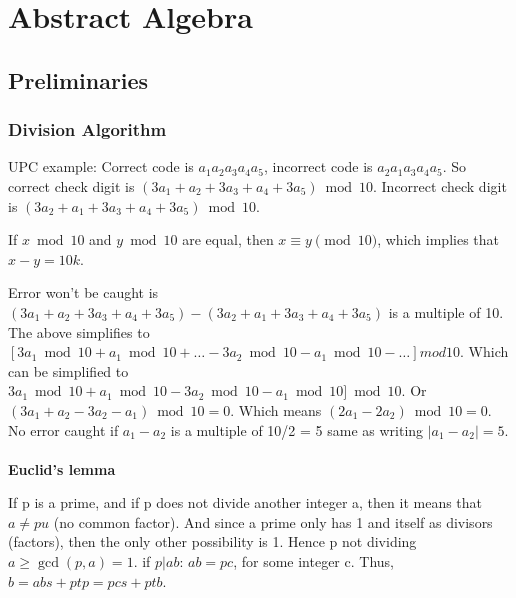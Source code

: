 \section{Abstract Algebra}

\subsection{Preliminaries}

\subsubsection{Division Algorithm}

UPC example:
Correct code is $a_1 a_2 a_3 a_4 a_5$, incorrect code is $a_2 a_1 a_3 a_4 a_5$.
So correct check digit is $(3a_1 + a_2 + 3a_3 + a_4 + 3a_5) \bmod 10$. 
Incorrect check digit is $(3a_2 + a_1 + 3a_3 + a_4 + 3a_5) \bmod 10$. 

If $x \bmod 10$ and $y \bmod 10$ are equal, then $x \equiv y \pmod 10$, which implies that $x - y = 10k$.

Error won’t be caught is $(3a_1 + a_2 + 3a_3 + a_4 + 3a_5) - (3a_2 + a_1 + 3a_3 + a_4 + 3a_5)$ is a multiple of 10. 
The above simplifies to $[3a_1 \bmod 10 + a_1 \bmod 10 + \dots - 3a_2 \bmod 10 - a_1 \bmod 10 - \dots] mod 10$.
Which can be simplified to $3a_1 \bmod 10 + a_1 \bmod 10 - 3a_2 \bmod 10 - a_1 \bmod 10] \bmod 10$.
Or $(3a_1 + a_2 - 3a_2 - a_1) \bmod 10 = 0$. 
Which means $(2a_1 - 2a_2) \bmod 10 = 0$.
No error caught if $a_1 - a_2$ is a multiple of 10/2 = 5 same as writing $|a_1 - a_2| = 5$.
\\~\\



\textbf{Euclid’s lemma}

If p is a prime, and if p does not divide another integer a, then it means that $a \neq pu$ (no common factor).
And since a prime only has 1 and itself as divisors (factors), then the only other possibility is 1.
Hence p not dividing $a \geq \gcd(p, a) = 1$.
if $p | ab$: $ab = pc$, for some integer c.
Thus, $b = abs + ptp = pcs + ptb$.
\\~\\

